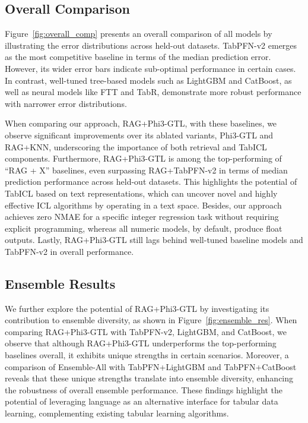 \subsection{Overall Comparison}
\label{sec:exp_overall_comp}


Figure~\ref{fig:overall_comp} presents an overall comparison of all models by illustrating the error distributions across held-out datasets. TabPFN-v2 emerges as the most competitive baseline in terms of the median prediction error. However, its wider error bars indicate sub-optimal performance in certain cases. In contrast, well-tuned tree-based models such as LightGBM and CatBoost, as well as neural models like FTT and TabR, demonstrate more robust performance with narrower error distributions.

When comparing our approach, RAG+Phi3-GTL, with these baselines, we observe significant improvements over its ablated variants, Phi3-GTL and RAG+KNN, underscoring the importance of both retrieval and TabICL components. Furthermore, RAG+Phi3-GTL is among the top-performing of ``RAG + X'' baselines, even surpassing RAG+TabPFN-v2 in terms of median prediction performance across held-out datasets.
This highlights the potential of TabICL based on text representations, which can uncover novel and highly effective ICL algorithms by operating in a text space.
Besides, our approach achieves zero NMAE for a specific integer regression task without requiring explicit programming, whereas all numeric models, by default, produce float outputs.
Lastly, RAG+Phi3-GTL still lags behind well-tuned baseline models and TabPFN-v2 in overall performance.


\subsection{Ensemble Results}
\label{sec:exp_ensemble_res}

We further explore the potential of RAG+Phi3-GTL by investigating its contribution to ensemble diversity, as shown in Figure~\ref{fig:ensemble_res}.
When comparing RAG+Phi3-GTL with TabPFN-v2, LightGBM, and CatBoost, we observe that although RAG+Phi3-GTL underperforms the top-performing baselines overall, it exhibits unique strengths in certain scenarios.
Moreover, a comparison of Ensemble-All with TabPFN+LightGBM and TabPFN+CatBoost reveals that these unique strengths translate into ensemble diversity, enhancing the robustness of overall ensemble performance.
These findings highlight the potential of leveraging language as an alternative interface for tabular data learning, complementing existing tabular learning algorithms.

